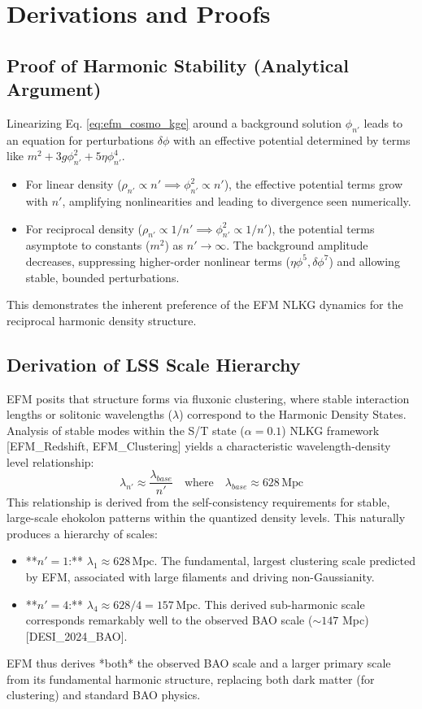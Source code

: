 \documentclass[11pt]{article}
\begin{document}
\section{Derivations and Proofs}

\subsection{Proof of Harmonic Stability (Analytical Argument)}
Linearizing Eq. \ref{eq:efm_cosmo_kge} around a background solution \(\phi_{n'}\) leads to an equation for perturbations \(\delta\phi\) with an effective potential determined by terms like \(m^2 + 3g\phi_{n'}^2 + 5\eta\phi_{n'}^4\).
\begin{itemize}
    \item For linear density (\(\rho_{n'} \propto n' \implies \phi_{n'}^2 \propto n'\)), the effective potential terms grow with \(n'\), amplifying nonlinearities and leading to divergence seen numerically.
    \item For reciprocal density (\(\rho_{n'} \propto 1/n' \implies \phi_{n'}^2 \propto 1/n'\)), the potential terms asymptote to constants (\(m^2\)) as \(n' \to \infty\). The background amplitude decreases, suppressing higher-order nonlinear terms (\(\eta\phi^5, \delta\phi^7\)) and allowing stable, bounded perturbations.
\end{itemize}
This demonstrates the inherent preference of the EFM NLKG dynamics for the reciprocal harmonic density structure.

\subsection{Derivation of LSS Scale Hierarchy}
EFM posits that structure forms via fluxonic clustering, where stable interaction lengths or solitonic wavelengths (\(\lambda\)) correspond to the Harmonic Density States. Analysis of stable modes within the S/T state (\(\alpha=0.1\)) NLKG framework [EFM\_Redshift, EFM\_Clustering] yields a characteristic wavelength-density level relationship:
\begin{equation}
\lambda_{n'} \approx \frac{\lambda_{base}}{n'} \quad \text{where} \quad \lambda_{base} \approx 628 \, \text{Mpc}
\end{equation}
This relationship is derived from the self-consistency requirements for stable, large-scale ehokolon patterns within the quantized density levels. This naturally produces a hierarchy of scales:
\begin{itemize}
    \item **\(n'=1\):** \(\lambda_1 \approx 628 \, \text{Mpc}\). The fundamental, largest clustering scale predicted by EFM, associated with large filaments and driving non-Gaussianity.
    \item **\(n'=4\):** \(\lambda_4 \approx 628 / 4 = 157 \, \text{Mpc}\). This derived sub-harmonic scale corresponds remarkably well to the observed BAO scale (\(\sim 147\) Mpc) [DESI\_2024\_BAO].
\end{itemize}
EFM thus derives *both* the observed BAO scale and a larger primary scale from its fundamental harmonic structure, replacing both dark matter (for clustering) and standard BAO physics.
\end{document}
